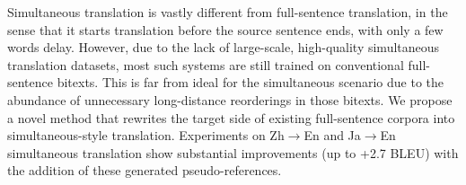 Simultaneous translation is vastly different from full-sentence translation, in the sense that it starts translation before the source sentence ends, with only a few words delay. However, due to the lack of large-scale, high-quality simultaneous translation datasets, most such systems are still trained on conventional full-sentence bitexts. This is far from ideal for the simultaneous scenario due to the abundance of unnecessary long-distance reorderings in those bitexts. We propose a novel method that rewrites the target side of existing full-sentence corpora into simultaneous-style translation. Experiments on Zh$\rightarrow$En and Ja$\rightarrow$En simultaneous translation show substantial improvements (up to +2.7 BLEU) with the addition of these generated pseudo-references.
